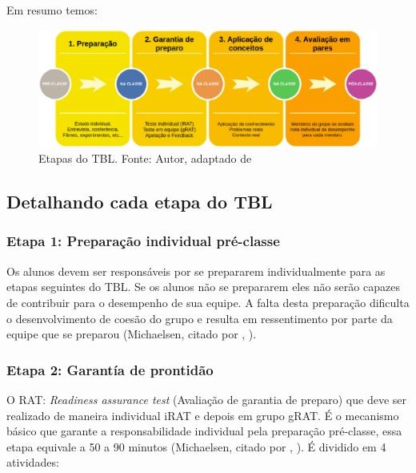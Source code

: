 Em resumo temos:

\begin{figure}[h!]
	\centering
  \includegraphics[keepaspectratio=true,scale=0.5]{figuras/tbl2.eps}
  \caption[Etapas do TBL.]{Etapas do TBL. Fonte: Autor, adaptado de \cite{bollela}}
	\label{fig:tbl2}
\end{figure}

\subsection{Detalhando cada etapa do TBL}

\subsubsection{Etapa 1: Preparação individual pré-classe}

Os alunos devem ser responsáveis por se prepararem individualmente para as etapas seguintes do TBL. Se os alunos não se prepararem eles não serão capazes de contribuir para o desempenho de sua equipe. A falta desta preparação dificulta o desenvolvimento de coesão do grupo e resulta em ressentimento por parte da equipe que se preparou (Michaelsen, citado por \citeauthor{bollela}, \citeyear{bollela}).

\subsubsection{Etapa 2: Garantía de prontidão}

O RAT: \textit{Readiness assurance test} (Avaliação de garantia de preparo) que deve ser realizado de maneira individual iRAT e depois em grupo gRAT. É o mecanismo básico que garante a responsabilidade individual pela preparação pré-classe, essa etapa equivale a 50 a 90 minutos (Michaelsen, citado por \citeauthor{bollela}, \citeyear{bollela}). É dividido em 4 atividades:

